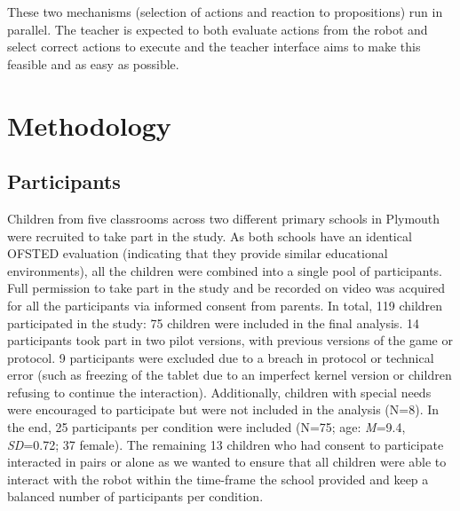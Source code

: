 These two mechanisms (selection of actions and reaction to propositions) run in parallel. The teacher is expected to both evaluate actions from the robot and select correct actions to execute and the teacher interface aims to make this feasible and as easy as possible.

\section{Methodology}

\subsection{Participants}

Children from five classrooms across two different primary schools in Plymouth were recruited to take part in the study. As both schools have an identical OFSTED evaluation (indicating that they provide similar educational environments), all the children were combined into a single pool of participants. Full permission to take part in the study and be recorded on video was acquired for all the participants via informed consent from parents. In total, 119 children participated in the study: 75 children were included in the final analysis. 14 participants took part in two pilot versions, with previous versions of the game or protocol. 9 participants were excluded due to a breach in protocol or technical error (such as freezing of the tablet due to an imperfect kernel version or children refusing to continue the interaction). Additionally, children with special needs were encouraged to participate but were not included in the analysis (N=8). In the end, 25 participants per condition were included (N=75; age: \textit{M}=9.4, \textit{SD}=0.72; 37 female). The remaining 13 children who had consent to participate interacted in pairs or alone as we wanted to ensure that all children were able to interact with the robot within the time-frame the school provided and keep a balanced number of participants per condition. 

